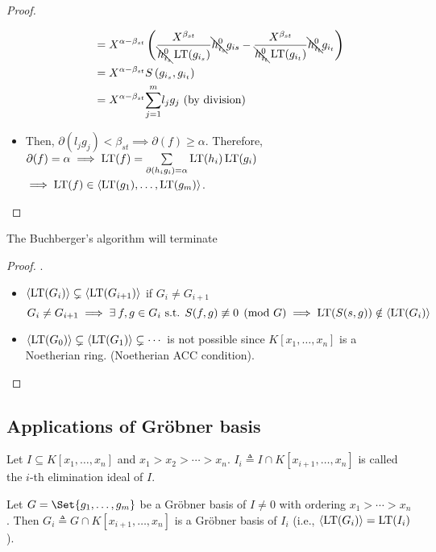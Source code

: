 \begin{theorem}
\begin{proof}
\begin{itemize}
\[\begin{split}
            &= X^{\alpha-\beta_{st}} \left( \frac{X^{\beta_{st}}}{\bcancel{h_{i_s}^0}\operatorname{LT}(g_{i_s})}\bcancel{h_{i_s}^0}g_{is} - \frac{X^{\beta_{st}}}{\bcancel{h_{i_t}^0}\operatorname{LT}(g_{i_t})}\bcancel{h_{i_t}^0}g_{i_t}  \right) \\
            &= X^{\alpha-\beta_{st}} S\left(g_{i_s},g_{i_t}\right) \\
            &= X^{\alpha-\beta_{st}}\overset{m}{\underset{j = 1}{\sum}}{l_jg_j} \text{ (by division)}
          \end{split}
        \]
      \item Then, $\partial(l_jg_j) < \beta_{st} \implies \partial(f) \geq \alpha$.
        Therefore, $\partial(f) = \alpha \implies \operatorname{LT}(f) =
        \sum\limits_{\partial(h_ig_i) = \alpha} \operatorname{LT}(h_i)\operatorname{LT}(g_i)$
        $\implies \operatorname{LT}(f) \in \langle \operatorname{LT}(g_1),\dots, \operatorname{LT}(g_m) \rangle$.
    \end{itemize}
  \end{proof}
\end{theorem}

\begin{theorem}
  The Buchberger's algorithm will terminate
  \begin{proof}
    $.$
    \begin{itemize}
      \item $\langle \operatorname{LT}(G_i) \rangle \subsetneq \langle \operatorname{LT}(G_{i+1}) \rangle$ if $G_i \neq G_{i+1}$
        \[
          G_i \neq G_{i+1} \implies \exists f, g \in G_i \text{ s.t. } S(f,g)
          \not\equiv 0 \pmod G \implies \LT(S(s,g)) \notin \gen{\LT(G_i)}
        \]
      \item $\langle \operatorname{LT}(G_0) \rangle \subsetneq \langle \operatorname{LT}(G_1) \rangle \subsetneq \dotsm$
        is not possible since $K[x_1, \dots, x_n]$ is a Noetherian ring.
        (Noetherian ACC condition).
    \end{itemize}
  \end{proof}
\end{theorem}

\subsection{Applications of Gr\"{o}bner basis}
\begin{definition}
  Let $I \subseteq K[x_1, \dots, x_n]$ and $x_1 > x_2 > \dotsm > x_n$.
  $I_i \triangleq I \cap K[x_{i+1}, \dots, x_n]$ is called the $i$-th elimination
  ideal of $I$.
\end{definition}

\begin{theorem}
  Let $G = \Set{g_1, \dots, g_m}$ be a Gr\"obner basis of $I \neq 0$ with ordering
  $x_1 > \dotsm > x_n$. Then $G_i \triangleq G \cap K[x_{i+1}, \dots, x_n]$
  is a Gr\"obner basis of $I_i$ (i.e., $\langle \operatorname{LT}(G_i) \rangle = \operatorname{LT}(I_i)$).
\end{theorem}

